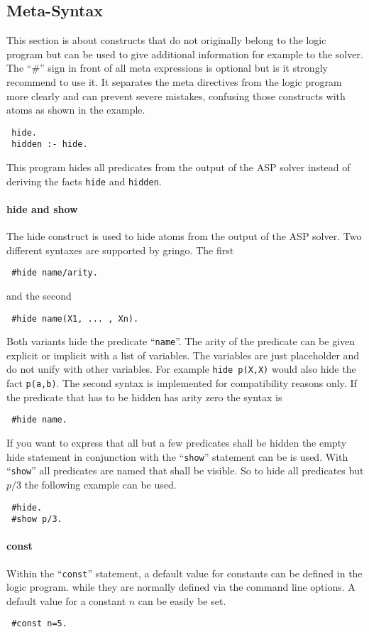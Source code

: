 \documentclass[a4paper,10pt]{article}
\begin{document}
\subsection{Meta-Syntax}
This section is about constructs that do not originally belong to the logic program but can be used to give additional information for example to the solver.
The ``\#'' sign in front of all meta expressions is optional but is it strongly recommend to use it.
It separates the meta directives from the logic program more clearly and can prevent severe mistakes,
 confusing those constructs with atoms as shown in the example.
\begin{verbatim}
 hide.
 hidden :- hide.
\end{verbatim}
This program hides all predicates from the output of the ASP solver instead of deriving the facts \texttt{hide} and \texttt{hidden}.

\paragraph{hide and show}
The hide construct is used to hide atoms from the output of the ASP solver.
Two different syntaxes are supported by gringo.
The first 
\begin{verbatim}
 #hide name/arity.
\end{verbatim}
and the second
\begin{verbatim}
 #hide name(X1, ... , Xn).
\end{verbatim}
Both variants hide the predicate ``\texttt{name}''.
The arity of the predicate can be given explicit or implicit with a list of variables.
The variables are just placeholder and do not unify with other variables. For example \texttt{hide p(X,X)} would also hide the fact \texttt{p(a,b)}. The second syntax is implemented for compatibility reasons only.
If the predicate that has to be hidden has arity zero the syntax is
\begin{verbatim}
 #hide name.
\end{verbatim}
If you want to express that all but a few predicates shall be hidden the empty hide statement
in conjunction with the ``\texttt{show}'' statement can be is used.
With ``\texttt{show}'' all predicates are named that shall be visible.
So to hide all predicates but $p/3$ the following example can be used.
\begin{verbatim}
 #hide.
 #show p/3.
\end{verbatim}

\paragraph{const}
Within the ``\texttt{const}'' statement, a default value for constants can be defined in the logic program.
while they are normally defined via the command line options.
A default value for a constant $n$ can be easily be set.
\begin{verbatim}
 #const n=5.
\end{verbatim}
\end{document}
